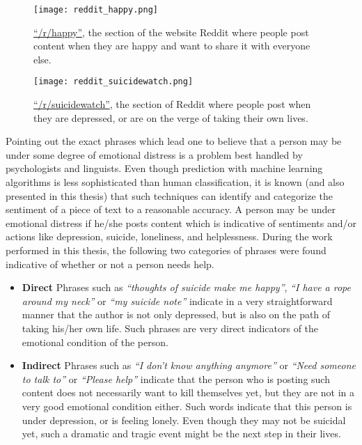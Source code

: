 \begin{figure}[t!]
    \centering
    \texttt{[image: reddit\_happy.png]}
    \caption{\href{http://www.reddit.com/r/happy}{``/r/happy''}, the section of the website Reddit \cite{reddit} where people post content when they are happy and want to share it with everyone else.}
    \label{fig:reddit_happy}
\end{figure}

\begin{figure}[t!]
    \centering
    \texttt{[image: reddit\_suicidewatch.png]}
    \caption{\href{http://www.reddit.com/r/suicidewatch}{``/r/suicidewatch''}, the section of Reddit \cite{reddit} where people post when they are depressed, or are on the verge of taking their own lives.}
    \label{fig:reddit_suicidewatch}
\end{figure}

Pointing out the exact phrases which lead one to believe that a person may be under some degree of emotional distress is a problem best handled by psychologists and linguists. Even though prediction with machine learning algorithms is less sophisticated than human classification, it is known (and also presented in this thesis) that such techniques can identify and categorize the sentiment of a piece of text to a reasonable accuracy. A person may be under emotional distress if he/she posts content which is indicative of sentiments and/or actions like depression, suicide, loneliness, and helplessness. During the work performed in this thesis, the following two categories of phrases were found indicative of whether or not a person needs help.

\begin{itemize}
    \item{\textbf{Direct} Phrases such as \emph{``thoughts of suicide make me happy''}, \emph{``I have a rope around my neck''} or \emph{``my suicide note''} indicate in a very straightforward manner that the author is not only depressed, but is also on the path of taking his/her own life. Such phrases are very direct indicators of the emotional condition of the person.}
    \item{\textbf{Indirect} Phrases such as \emph{``I don't know anything anymore''} or \emph{``Need someone to talk to''} or \emph{``Please help''} indicate that the person who is posting such content does not necessarily want to kill themselves yet, but they are not in a very good emotional condition either. Such words indicate that this person is under depression, or is feeling lonely. Even though they may not be suicidal yet, such a dramatic and tragic event might be the next step in their lives.}
\end{itemize}

